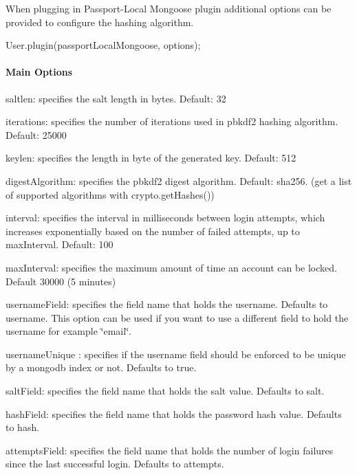 When plugging in Passport-\/\+Local Mongoose plugin additional options can be provided to configure the hashing algorithm.


\begin{DoxyCode}
User.plugin(passportLocalMongoose, options);
\end{DoxyCode}


\paragraph*{Main Options}


\begin{DoxyItemize}
\item saltlen\+: specifies the salt length in bytes. Default\+: 32
\item iterations\+: specifies the number of iterations used in pbkdf2 hashing algorithm. Default\+: 25000
\item keylen\+: specifies the length in byte of the generated key. Default\+: 512
\item digest\+Algorithm\+: specifies the pbkdf2 digest algorithm. Default\+: sha256. (get a list of supported algorithms with crypto.\+get\+Hashes())
\item interval\+: specifies the interval in milliseconds between login attempts, which increases exponentially based on the number of failed attempts, up to max\+Interval. Default\+: 100
\item max\+Interval\+: specifies the maximum amount of time an account can be locked. Default 30000 (5 minutes)
\item username\+Field\+: specifies the field name that holds the username. Defaults to \textquotesingle{}username\textquotesingle{}. This option can be used if you want to use a different field to hold the username for example \char`\"{}email\char`\"{}.
\item username\+Unique \+: specifies if the username field should be enforced to be unique by a mongodb index or not. Defaults to true.
\item salt\+Field\+: specifies the field name that holds the salt value. Defaults to \textquotesingle{}salt\textquotesingle{}.
\item hash\+Field\+: specifies the field name that holds the password hash value. Defaults to \textquotesingle{}hash\textquotesingle{}.
\item attempts\+Field\+: specifies the field name that holds the number of login failures since the last successful login. Defaults to \textquotesingle{}attempts\textquotesingle{}.

\end{DoxyItemize}
